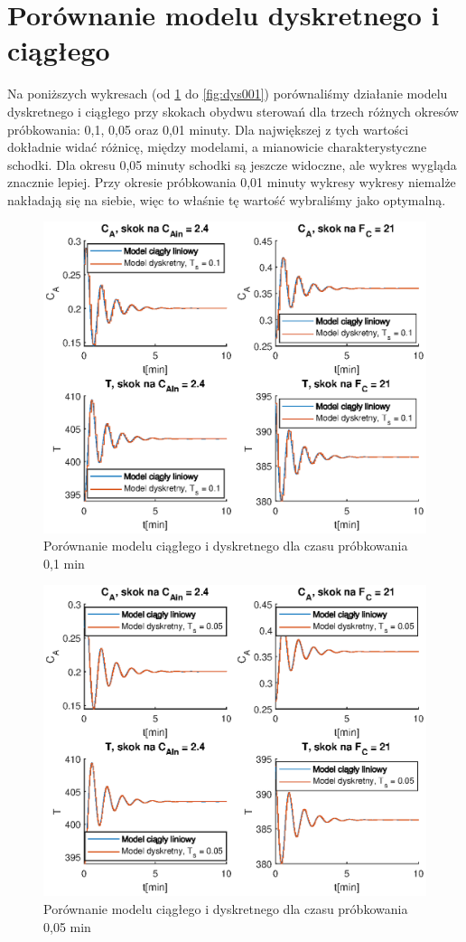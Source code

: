 \section{Porównanie modelu dyskretnego i ciągłego}
Na poniższych wykresach (od \ref{fig:dys01} do \ref{fig:dys001}) porównaliśmy działanie modelu dyskretnego i ciągłego przy skokach obydwu sterowań dla trzech różnych okresów próbkowania: 0,1, 0,05 oraz 0,01 minuty. Dla największej z tych wartości dokładnie widać różnicę, między modelami, a mianowicie charakterystyczne schodki. Dla okresu 0,05 minuty schodki są jeszcze widoczne, ale wykres wygląda znacznie lepiej. Przy okresie próbkowania 0,01 minuty wykresy wykresy niemalże nakładają się na siebie, więc to właśnie tę wartość wybraliśmy jako optymalną.
\begin{figure}
	\centering
	\includegraphics[width=.8\linewidth]{plot/dysk_1.eps}
	\caption{Porównanie modelu ciągłego i dyskretnego dla czasu próbkowania 0,1 min}
	\label{fig:dys01}
\end{figure}
\begin{figure}
\centering
\includegraphics[width=.8\linewidth]{plot/dysk_05.eps}
\caption{Porównanie modelu ciągłego i dyskretnego dla czasu próbkowania 0,05 min}
\label{fig:dys005}
\end{figure}
